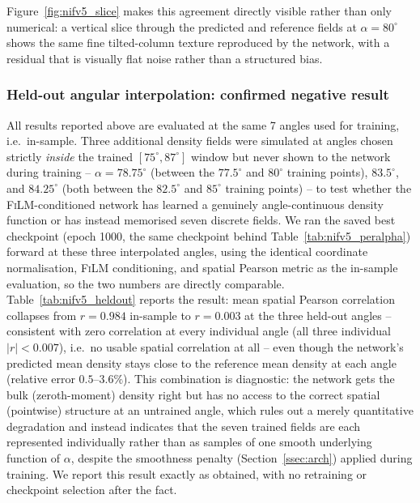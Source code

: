 \documentclass[aip,amsmath,amssymb,reprint]{revtex4-1}
\renewcommand{\ang}{\ensuremath{\alpha}} %
\newcommand{\film}{\textsc{FiLM}}
\begin{document}
Figure~\ref{fig:nifv5_slice} makes this agreement directly visible rather
than only numerical: a vertical slice through the predicted and
reference fields at $\ang=80^{\circ}$ shows the same fine tilted-column
texture reproduced by the network, with a residual that is visually flat
noise rather than a structured bias.

\subsubsection{Held-out angular interpolation: confirmed negative result}
\label{sssec:res1_heldout}

All results reported above are evaluated at the same 7 angles used for
training, i.e.\ in-sample. Three additional density fields were
simulated at angles chosen strictly \emph{inside} the trained
$[75^{\circ},87^{\circ}]$ window but never shown to the network during
training -- $\ang=78.75^{\circ}$ (between the $77.5^{\circ}$ and
$80^{\circ}$ training points), $83.5^{\circ}$, and $84.25^{\circ}$
(both between the $82.5^{\circ}$ and $85^{\circ}$ training points) --
to test whether the \film{}-conditioned network has learned a
genuinely angle-continuous density function or has instead memorised
seven discrete fields. We ran the saved best checkpoint
(epoch 1000, the same checkpoint behind Table~\ref{tab:nifv5_peralpha})
forward at these three interpolated angles, using the identical
coordinate normalisation, \film{} conditioning, and spatial Pearson
metric as the in-sample evaluation, so the two numbers are directly
comparable.
Table~\ref{tab:nifv5_heldout} reports the result: mean spatial Pearson
correlation collapses from $r=0.984$ in-sample to $r=0.003$ at the
three held-out angles -- consistent with zero correlation at every
individual angle (all three individual $|r| < 0.007$), i.e.\ no usable
spatial correlation at all -- even though the network's predicted mean
density stays close to the reference mean density at each angle
(relative error $0.5$--$3.6\%$). This combination is diagnostic: the
network gets the bulk (zeroth-moment) density right but has no access
to the correct spatial (pointwise) structure at an untrained angle,
which rules out a merely quantitative degradation and instead
indicates that the seven trained fields are each represented
individually rather than as samples of one smooth underlying function
of $\ang$, despite the smoothness penalty (Section~\ref{ssec:arch})
applied during training. We report this result exactly as obtained,
with no retraining or checkpoint selection after the fact.
\end{document}
